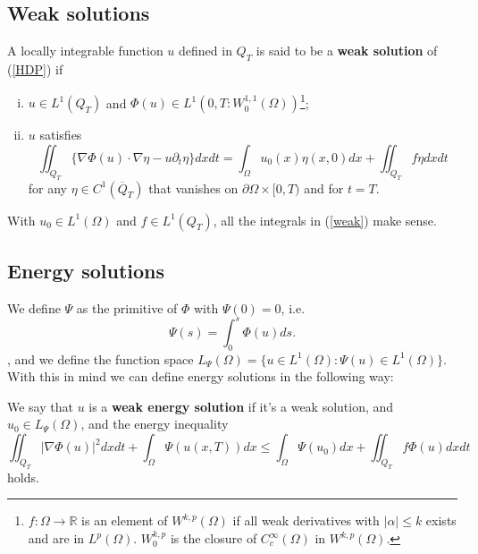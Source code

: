 \documentclass[11pt, a4paper]{article}
\begin{document}
\subsection{Weak solutions}
\begin{mydef}
A locally integrable function $u$ defined in $Q_T$ is said to be a \textbf{weak solution} of (\ref{HDP}) if
\begin{enumerate}[i)]
	\item $u \in L^1(Q_T)$ and $\Phi(u) \in L^1(0,T : W_0^{1,1}(\Omega))$\footnote{$f:\Omega \to \mathbb{R}$ is an element of $W^{k,p}(\Omega)$ if all weak derivatives with $|\alpha| \leq k$ exists and are in $L^p(\Omega)$. $W_0^{k,p}$ is the closure of $C^\infty_c(\Omega)$ in $W^{k,p}(\Omega)$.};
	\item $u$ satisfies
		\begin{equation}
		\label{weak}
		\iint_{Q_T} \{\nabla\Phi(u)\cdot \nabla\eta - u\partial_t \eta \}dxdt = \int_\Omega u_0(x)\eta(x,0)dx + \iint_{Q_T}f\eta dxdt
		\end{equation}
for any $\eta \in C^1(\overline{Q}_T)$ that vanishes on $\partial \Omega \times [0,T)$ and for $t=T$.
\end{enumerate}
\end{mydef}

\begin{obs}
With $u_0 \in L^1(\Omega)$ and $f\in L^1(Q_T)$, all the integrals in (\ref{weak}) make sense.
\end{obs}

\subsection{Energy solutions}
We define  $\Psi$ as the primitive of $\Phi$ with $\Psi(0) = 0$, i.e.
\begin{equation*}
	\Psi(s) = \int_0^s \Phi(u) ds.
\end{equation*},
and we define the function space $L_\Psi(\Omega) = \{ u\in L^1(\Omega): \Psi(u)\in L^1(\Omega)\}$.
With this in mind we can define energy solutions in the following way:
\begin{mydef}
We say that $u$ is a \textbf{weak energy solution} if it's a weak solution, and $u_0 \in L_\Psi(\Omega)$, and the energy inequality
\begin{equation}
\label{energy_ineq}
\iint_{Q_T} |\nabla \Phi(u)|^2 dxdt + \int_\Omega \Psi(u(x,T))dx \leq \int_\Omega \Psi(u_0)dx + \iint_{Q_T}f\Phi(u)dxdt
\end{equation}
holds.
\end{mydef}
\end{document}
